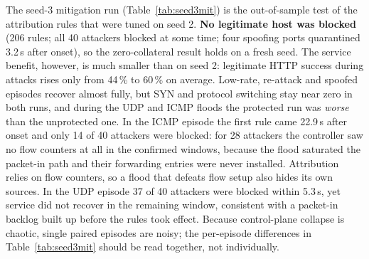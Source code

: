 \documentclass[conference]{IEEEtran}
\begin{document}
The seed-3 mitigation run (Table~\ref{tab:seed3mit}) is the out-of-sample test of the attribution rules that were tuned on seed 2. \textbf{No legitimate host was blocked} (206 rules; all 40 attackers blocked at some time; four spoofing ports quarantined 3.2\,s after onset), so the zero-collateral result holds on a fresh seed. The service benefit, however, is much smaller than on seed 2: legitimate HTTP success during attacks rises only from 44\,\% to 60\,\% on average. Low-rate, re-attack and spoofed episodes recover almost fully, but SYN and protocol switching stay near zero in both runs, and during the UDP and ICMP floods the protected run was \emph{worse} than the unprotected one. In the ICMP episode the first rule came 22.9\,s after onset and only 14 of 40 attackers were blocked: for 28 attackers the controller saw no flow counters at all in the confirmed windows, because the flood saturated the packet-in path and their forwarding entries were never installed. Attribution relies on flow counters, so a flood that defeats flow setup also hides its own sources. In the UDP episode 37 of 40 attackers were blocked within 5.3\,s, yet service did not recover in the remaining window, consistent with a packet-in backlog built up before the rules took effect. Because control-plane collapse is chaotic, single paired episodes are noisy; the per-episode differences in Table~\ref{tab:seed3mit} should be read together, not individually.
\end{document}

